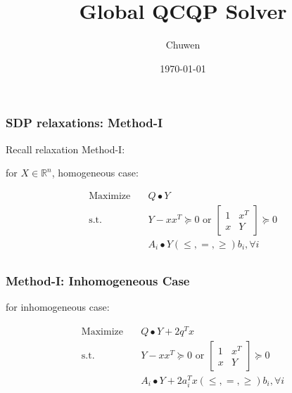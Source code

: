 
\usepackage{subfig}
\usepackage[style=verbose]{biblatex}
\title{Global QCQP Solver}
\author{Chuwen}
\date{\today}




\fontsize{10pt}{11.2}\selectfont
\frame{\titlepage}



\begin{frame}
  \frametitle{SDP relaxations: Method-I}
  Recall relaxation Method-I:

  for \(X \in \mathbb{R}^{n}\), homogeneous case:

  \begin{equation}
    \begin{aligned}
      \mathrm{Maximize} \quad & Q\bullet Y                                                        \\
      \mathrm{s.t.}  \quad    & Y-xx^T \succeq 0 \text { or } \begin{bmatrix} 1 & x^{T} \\ x & Y \end{bmatrix} \succeq 0 \\
                              & A_i \bullet Y (\le,=, \ge) b_i, \forall i                         \\
    \end{aligned}
  \end{equation}

\end{frame}



\begin{frame}
  \frametitle{Method-I: Inhomogeneous Case}

  for inhomogeneous case:

  \begin{equation}\label{eq:sdp_normal}
    \begin{aligned}
      \mathrm{Maximize} \quad & Q\bullet Y   + 2q^T x                                            \\
      \mathrm{s.t.}  \quad    & Y-xx^T \succeq 0 \text { or }\begin{bmatrix} 1 & x^{T} \\ x & Y \end{bmatrix} \succeq 0 \\
                              & A_i \bullet Y +2 a_i^Tx (\le,=, \ge) b_i, \forall i              \\
    \end{aligned}
  \end{equation}

\end{frame}


